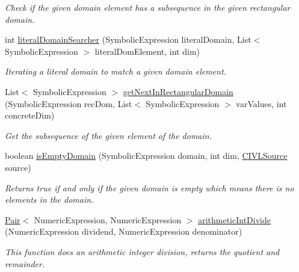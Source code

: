 \begin{DoxyCompactItemize}
\begin{DoxyCompactList}\small\item\em Check if the given domain element has a subsequence in the given rectangular domain. \end{DoxyCompactList}\item 
int \hyperlink{classedu_1_1udel_1_1cis_1_1vsl_1_1civl_1_1dynamic_1_1common_1_1CommonSymbolicUtility_aa067847fab759ff0940c9ded900a7520}{literal\+Domain\+Searcher} (Symbolic\+Expression literal\+Domain, List$<$ Symbolic\+Expression $>$ literal\+Dom\+Element, int dim)
\begin{DoxyCompactList}\small\item\em Iterating a literal domain to match a given domain element. \end{DoxyCompactList}\item 
List$<$ Symbolic\+Expression $>$ \hyperlink{classedu_1_1udel_1_1cis_1_1vsl_1_1civl_1_1dynamic_1_1common_1_1CommonSymbolicUtility_a51ca3df071d373d810cf904a2e380fd2}{get\+Next\+In\+Rectangular\+Domain} (Symbolic\+Expression rec\+Dom, List$<$ Symbolic\+Expression $>$ var\+Values, int concrete\+Dim)
\begin{DoxyCompactList}\small\item\em Get the subsequence of the given element of the domain. \end{DoxyCompactList}\item 
boolean \hyperlink{classedu_1_1udel_1_1cis_1_1vsl_1_1civl_1_1dynamic_1_1common_1_1CommonSymbolicUtility_acf3e65a7f014f13c663f069192c71d3b}{is\+Empty\+Domain} (Symbolic\+Expression domain, int dim, \hyperlink{interfaceedu_1_1udel_1_1cis_1_1vsl_1_1civl_1_1model_1_1IF_1_1CIVLSource}{C\+I\+V\+L\+Source} source)
\begin{DoxyCompactList}\small\item\em Returns true if and only if the given domain is empty which means there is no elements in the domain. \end{DoxyCompactList}\item 
\hyperlink{classedu_1_1udel_1_1cis_1_1vsl_1_1civl_1_1util_1_1IF_1_1Pair}{Pair}$<$ Numeric\+Expression, Numeric\+Expression $>$ \hyperlink{classedu_1_1udel_1_1cis_1_1vsl_1_1civl_1_1dynamic_1_1common_1_1CommonSymbolicUtility_aa94f3283729252483f76074c315c1821}{arithmetic\+Int\+Divide} (Numeric\+Expression dividend, Numeric\+Expression denominator)
\begin{DoxyCompactList}\small\item\em This function does an arithmetic integer division, returns the quotient and remainder. \end{DoxyCompactList}\item 

\end{DoxyCompactItemize}
